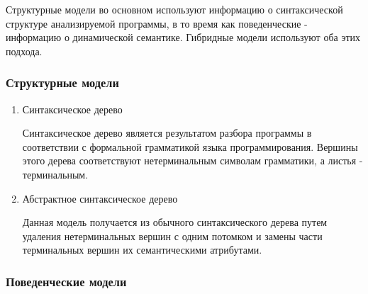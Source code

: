 Структурные модели во основном используют информацию о синтаксической структуре
анализируемой программы, в то время как поведенческие - информацию о
динамической семантике. Гибридные модели используют оба этих подхода.

\subsubsection{Структурные модели}
\begin{enumerate}
    \item Синтаксическое дерево

    Синтаксическое дерево является результатом разбора программы в
    соответствии с формальной грамматикой языка программирования. Вершины
    этого дерева соответствуют нетерминальным символам грамматики, а листья
    - терминальным.

    \item Абстрактное синтаксическое дерево

    Данная модель получается из обычного синтаксического дерева путем
    удаления нетерминальных вершин с одним потомком и замены части
    терминальных вершин их семантическими атрибутами.
\end{enumerate}

\subsubsection{Поведенческие модели}


